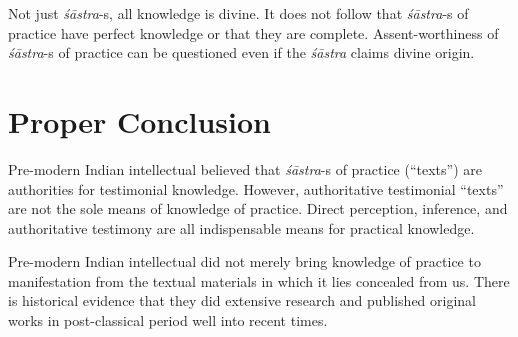 Not just {\sl śāstra}-s, all knowledge is divine. It does not follow that {\sl śāstra}-s of practice have perfect knowledge or that they are complete.
Assent-worthiness of {\sl śāstra}-s of practice can be questioned even if the {\sl śāstra} claims divine origin.

\section*{Proper Conclusion}

Pre-modern Indian intellectual believed that {\sl śāstra}-s of practice (``texts'') are authorities for testimonial knowledge. However, authoritative testimonial ``texts'' are not the sole means of knowledge of practice. Direct perception, inference, and authoritative testimony are all indispensable means for practical knowledge.

Pre-modern Indian intellectual did not merely bring knowledge of practice to manifestation from the textual materials in which it lies concealed from us. There is historical evidence that they did extensive research and published original works in post-classical period well into recent times.

\newpage

